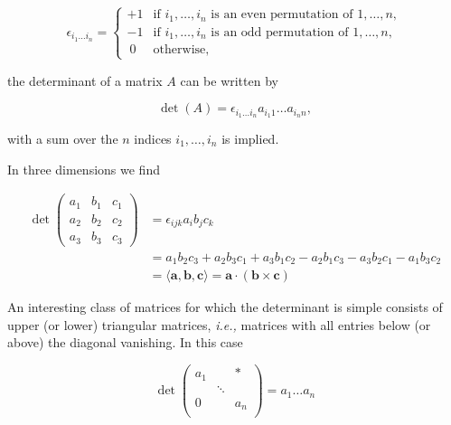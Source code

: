 \documentclass[a4paper,12pt]{report}
\begin{document}
\begin{equation}
    \epsilon_{i_1 \ldots  i_n} = 
    \begin{cases} 
    +1 & \text{if } i_1, \ldots, i_n \text{ is an even permutation of } 1, \ldots, n, \\ 
    -1 & \text{if } i_1, \ldots, i_n \text{ is an odd permutation of } 1, \ldots, n, \\ 
    ~0 & \text{otherwise}, 
    \end{cases}
\end{equation}
    
the determinant of a matrix \(A\) can be written by

\begin{equation}
    \det(A) = \epsilon_{i_1 \ldots  i_n} a_{i_1 1} \ldots  a_{i_n n},
\end{equation}
    
with a sum over the \( n \) indices \( i_1, \ldots, i_n \) is implied.

In three dimensions we find 

\begin{equation}
    \begin{aligned}
        \det \begin{pmatrix} 
        a_1 & b_1 & c_1 \\ 
        a_2 & b_2 & c_2 \\ 
        a_3 & b_3 & c_3 
        \end{pmatrix} 
        &= \epsilon_{ijk} a_i b_j c_k \\ 
        &= a_1 b_2 c_3 + a_2 b_3 c_1 + a_3 b_1 c_2 - a_2 b_1 c_3 - a_3 b_2 c_1 - a_1 b_3 c_2 \\
        &= \langle \mathbf{a}, \mathbf{b}, \mathbf{c} \rangle = \mathbf{a} \cdot (\mathbf{b} \times \mathbf{c})
    \end{aligned}
\end{equation}

An interesting class of matrices for which the determinant is simple consists of upper (or lower) triangular matrices, \textit{i.e.,} matrices with all entries below (or above) the diagonal vanishing. In this case

\begin{equation}
    \det \begin{pmatrix}
        a_1  &  & *  \\
         & \ddots  &   \\
        0 &  & a_{n}   \\
    \end{pmatrix} = a_1 \ldots a_{n} 
\end{equation}
\end{document}
